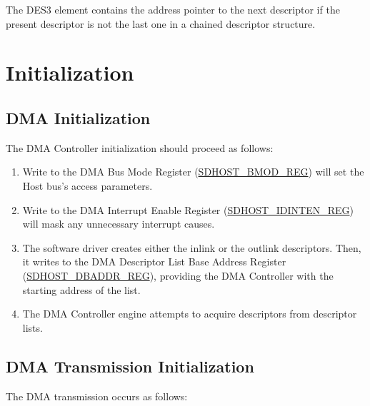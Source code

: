 \documentclass[main\_\_EN.tex]{subfiles}
\begin{document}


The DES3 element contains the address pointer to the next descriptor if the present descriptor is not the last one in a chained descriptor structure.



\section{Initialization}
\subsection{DMA Initialization}

The DMA Controller initialization should proceed as follows:

\begin{enumerate}
\item  Write to the DMA Bus Mode Register (\hyperref[regdesc:BMODREG]{SDHOST\_BMOD\_REG}) will set the Host bus's access parameters.
\item Write to the DMA Interrupt Enable Register (\hyperref[regdesc:IDINTENREG]{SDHOST\_IDINTEN\_REG}) will mask any unnecessary interrupt causes.
\item The software driver creates either the inlink or the outlink descriptors. Then, it writes to the DMA Descriptor List Base Address Register (\hyperref[regdesc:DBADDRREG]{SDHOST\_DBADDR\_REG}), providing the DMA Controller with the starting address of the list.
\item The DMA Controller engine attempts to acquire descriptors from descriptor lists.
\end{enumerate}

\subsection{DMA Transmission Initialization}

The DMA transmission occurs as follows:
\end{document}
